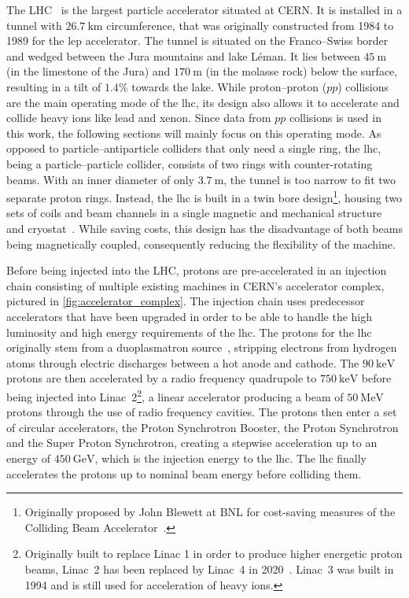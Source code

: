 The LHC~\cite{Bruning:782076} is the largest particle accelerator situated at CERN.
It is installed in a tunnel with $\SI{26.7}{\km}$ circumference, that was originally constructed from 1984 to 1989 for the \gls{lep} accelerator.
The tunnel is situated on the Franco--Swiss border and wedged between the Jura mountains and lake Léman. It lies between $\SI{45}{\meter}$ (in the limestone of the Jura) and $\SI{170}{\meter}$ (in the molasse rock) below the surface, resulting in a tilt of $1.4\%$ towards the lake. 
While proton--proton ($pp$) collisions are the main operating mode of the \gls{lhc}, its design also allows it to accelerate and collide heavy ions like lead and xenon.
Since data from $pp$ collisions is used in this work, the following sections will mainly focus on this operating mode.
As opposed to particle--antiparticle colliders that only need a single ring, the \gls{lhc}, being a particle--particle collider, consists of two rings with counter-rotating beams.
With an inner diameter of only $\SI{3.7}{\meter}$, the tunnel is too narrow to fit two separate proton rings.
Instead, the \gls{lhc} is built in a twin bore design\footnote{Originally proposed by John Blewett at BNL for cost-saving measures of the Colliding Beam Accelerator~\cite{blewett1971proceedings,Evans:1129806}.}, housing two sets of coils and beam channels in a single magnetic and mechanical structure and cryostat~\cite{Bruning:782076}.
While saving costs, this design has the disadvantage of both beams being magnetically coupled, consequently reducing the flexibility of the machine. 

Before being injected into the LHC, protons are pre-accelerated in an injection chain consisting of multiple existing machines in CERN's accelerator complex, pictured in \cref{fig:accelerator_complex}. The injection chain uses predecessor accelerators that have been upgraded in order to be able to handle the high luminosity and high energy requirements of the \gls{lhc}.
The protons for the \gls{lhc} originally stem from a duoplasmatron source~\cite{Scrivens:1382102}, stripping electrons from hydrogen atoms through electric discharges between a hot anode and cathode.
The $\SI{90}{\keV}$ protons are then accelerated by a radio frequency quadrupole to $\SI{750}{\keV}$ before being injected into Linac~2\footnote{Originally built to replace Linac 1 in order to produce higher energetic proton beams, Linac~2 has been replaced by Linac~4 in 2020~\cite{linac4:2736208}. Linac~3 was built in 1994 and is still used for acceleration of heavy ions.}, a linear accelerator producing a beam of $\SI{50}{\MeV}$ protons through the use of radio frequency cavities.
The protons then enter a set of circular accelerators, the Proton Synchrotron Booster, the Proton Synchrotron and the Super Proton Synchrotron, creating a stepwise acceleration up to an energy of $\SI{450}{\GeV}$, which is the injection energy to the \gls{lhc}. The \gls{lhc} finally accelerates the protons up to nominal beam energy before colliding them. 


